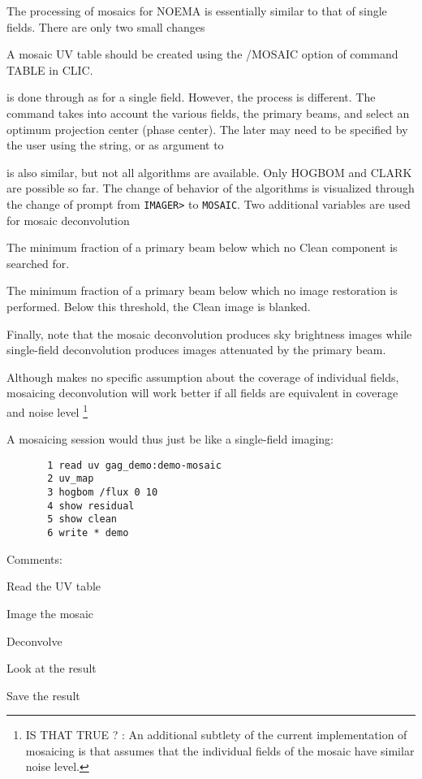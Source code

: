 The processing of mosaics for NOEMA is essentially similar to that
of single fields. There are only two small changes
\begin{description}\itemsep 0pt
\item[Creation of \uv{} table]  A mosaic UV table should be created
using the /MOSAIC option of command TABLE in CLIC.
\item[Imaging] is done through  as for a single field.
However, the process is different. The command takes into account
the various fields, the primary beams, and select an optimum projection
center (phase center). The later may need to be specified by the user
using the  string, or as argument to 
\item[Deconvolution] is also similar, but not all algorithms are
available. Only  HOGBOM and CLARK are possible so far.
The change of behavior of the \clean{} algorithms is visualized
through the change of prompt from \texttt{IMAGER>} to \texttt{MOSAIC}.
Two additional variables are used for mosaic deconvolution
\begin{description}\itemsep 0pt
\item[\sicvar{CLEAN\_SEARCH}] The minimum fraction of a primary beam
below which no Clean component is searched for.
\item[\sicvar{CLEAN\_RESTORE}] The minimum fraction of a primary beam
below which no image restoration is performed. Below this threshold,
the Clean image is blanked.
\end{description}
Finally, note that the mosaic deconvolution produces sky brightness
images while single-field deconvolution produces images attenuated by the
primary beam.
\end{description}
Although \imager{} makes no specific assumption about the \uv{} coverage
of individual fields, mosaicing deconvolution will work better
if all fields are equivalent in \uv{} coverage and noise level
\footnote{IS THAT TRUE ? : An additional subtlety of the current \imager{} implementation of
mosaicing is that \mapping{} assumes that the individual fields of the
mosaic have similar noise level.}

A mosaicing session would thus just be like a single-field
imaging:
\begin{verbatim}
       1 read uv gag_demo:demo-mosaic 
       2 uv_map
       3 hogbom /flux 0 10
       4 show residual
       5 show clean
       6 write * demo
\end{verbatim}
Comments:
\begin{description}\itemsep 0pt
\item[Step 1] Read the UV table
\item[Step 2] Image the mosaic
\item[Step 3] Deconvolve
\item[Steps 4-5] Look at the result
\item[Steps 6] Save the result
\end{description}

